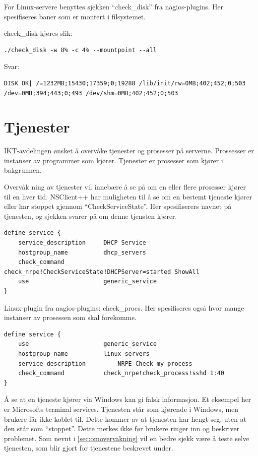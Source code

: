 For Linux-servere benyttes sjekken ``check\_disk'' fra nagios-plugins. Her spesifiseres baner som er montert i filsystemet.

check\_disk kjøres slik:
\begin{lstlisting}[style=example]
./check_disk -w 8% -c 4% --mountpoint --all
\end{lstlisting}
Svar: 
\begin{lstlisting}[style=example]
DISK OK| /=1232MB;15430;17359;0;19288 /lib/init/rw=0MB;402;452;0;503 /dev=0MB;394;443;0;493 /dev/shm=0MB;402;452;0;503
\end{lstlisting}

\section{Tjenester}
IKT-avdelingen ønsket å overvåke tjenester og prosesser på serverne. Prossesser er instanser av programmer som kjører. Tjenester er prosesser som kjører i bakgrunnen. 

Overvåk	ning av tjenester vil innebære å se på om en eller flere prosesser kjører til en hver tid. NSClient++ har muligheten til å se om en bestemt tjeneste kjører eller har stoppet gjennom ``CheckServiceState''. Her spesifiserers navnet på tjenesten, og sjekken svarer på om denne tjensten kjører.
\begin{lstlisting}[style=example]
define service {
    service_description     DHCP Service
    hostgroup_name          dhcp_servers
    check_command           check_nrpe!CheckServiceState!DHCPServer=started ShowAll
    use                     generic_service
}
\end{lstlisting}
Linux-plugin fra nagios-plugins: check\_procs. Her spesifiseres også hvor mange instanser av prosessen som skal forekomme. 
\begin{lstlisting}[style=example]
define service {
    use            	        generic_service
    hostgroup_name       	linux_servers
    service_description     	NRPE Check my process
    check_command        	check_nrpe!check_process!sshd 1:40
}
\end{lstlisting}

Å se at en tjeneste kjører via Windows kan gi falsk informasjon. Et eksempel her er Microsofts terminal services. Tjenesten står som kjørende i Windows, men brukere får ikke koblet til. Dette kommer av at tjenesten har hengt seg, uten at den står som ``stoppet''. Dette merkes ikke før brukere ringer inn og beskriver problemet\cite{serviceproblem}. Som nevnt i \ref{sec:omovervakning} vil en bedre sjekk være å teste selve tjenesten, som blir gjort for tjenestene beskrevet under.

